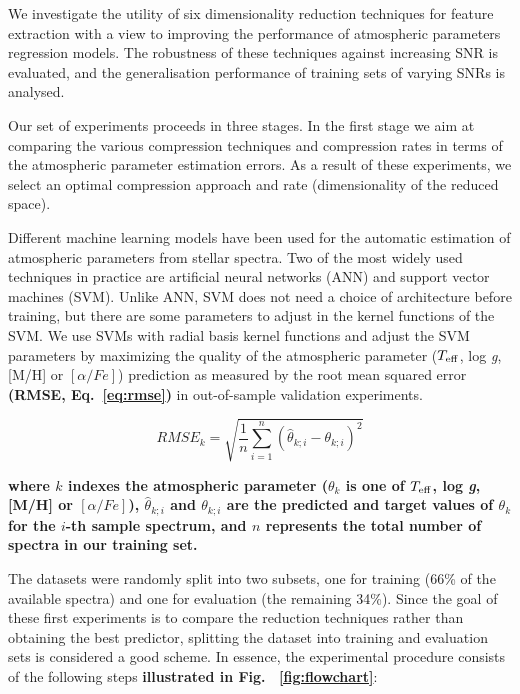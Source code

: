 \documentclass[a4paper,fleqn,usenatbib]{mnras}
\begin{document}
{{{We investigate the utility of six dimensionality reduction techniques
for feature extraction with a view to improving the performance of
atmospheric parameters regression models. The robustness of these
techniques against increasing SNR is evaluated, and the generalisation
performance of training sets of varying SNRs is analysed.

Our set of experiments proceeds in three stages. In the first stage we
aim at comparing the various compression techniques and compression
rates in terms of the atmospheric parameter estimation errors. As a
result of these experiments, we select an optimal compression approach
and rate (dimensionality of the reduced space).

Different machine learning models have been used for the automatic
estimation of atmospheric parameters from stellar spectra. Two of the
most widely used techniques in practice are artificial neural networks
(ANN) and support vector machines (SVM). Unlike ANN, SVM does not need
a choice of architecture before training, but there are some
parameters to adjust in the kernel functions of the SVM. We use SVMs
with radial basis kernel functions and adjust the SVM parameters by
maximizing the quality of the atmospheric parameter ($T_{\rm eff}$,
log \textit{g}, [M/H] or $\left[ \alpha/Fe \right]$) prediction as 
measured by the root mean squared error {\bf (RMSE, Eq.~\ref{eq:rmse})} 
in out-of-sample validation experiments.

\begin{equation}
\label{eq:rmse}
RMSE_k=\sqrt{\frac{1}{n}\sum_{i=1}^{n}\left(\hat{\theta}_{k;i}-\theta_{k;i}\right)^{2}}
\end{equation}

{\bf where $k$ indexes the atmospheric parameter 
	(${\theta}_{k}$ is one of $T_{\rm eff}$, log \textit{g}, 
	[M/H] or $\left[ \alpha/Fe \right]$), $\hat{\theta}_{k;i}$ and $\theta_{k;i}$
	are the predicted and target values of ${\theta}_{k}$ for the $i$-th 
	sample spectrum, and $n$ represents the total number of spectra in our training set.} 
  
The datasets were randomly split into two subsets, one for training
(66\% of the available spectra) and one for evaluation (the remaining
34\%). Since the goal of these first experiments is to compare the
reduction techniques rather than obtaining the best predictor,
splitting the dataset into training and evaluation sets is considered
a good scheme. In essence, the experimental procedure consists of the
following steps {\bf illustrated in Fig.~ \ref{fig:flowchart}}:

}}}
\end{document}
